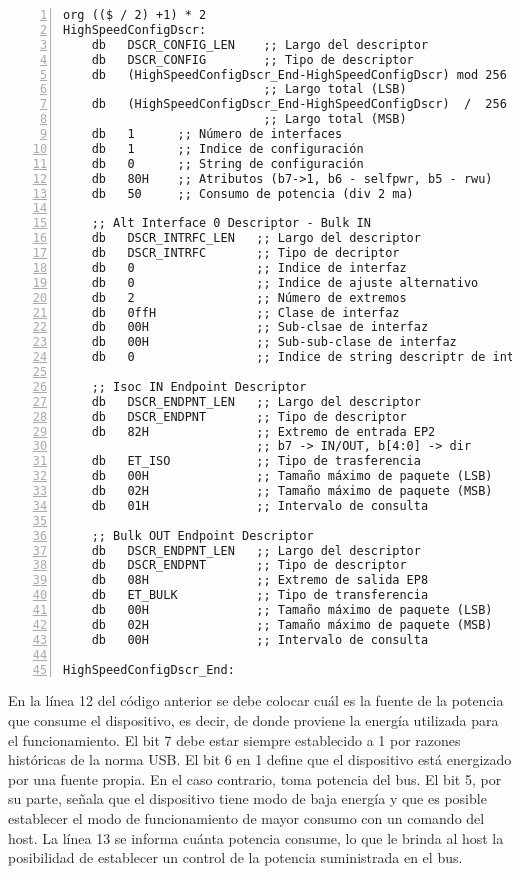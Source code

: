 	\begin{lstlisting}[language={[x86masm]Assembler},backgroundcolor=\color{gray!30},numbers=left]
org (($ / 2) +1) * 2
HighSpeedConfigDscr:
	db   DSCR_CONFIG_LEN	;; Largo del descriptor
	db   DSCR_CONFIG        ;; Tipo de descriptor
	db   (HighSpeedConfigDscr_End-HighSpeedConfigDscr) mod 256
							;; Largo total (LSB)
	db   (HighSpeedConfigDscr_End-HighSpeedConfigDscr)  /  256 
							;; Largo total (MSB)
	db   1      ;; Número de interfaces
	db   1      ;; Indice de configuración
	db   0		;; String de configuración
	db   80H	;; Atributos (b7->1, b6 - selfpwr, b5 - rwu)
	db   50		;; Consumo de potencia (div 2 ma)
	
	;; Alt Interface 0 Descriptor - Bulk IN
	db   DSCR_INTRFC_LEN   ;; Largo del descriptor
	db   DSCR_INTRFC       ;; Tipo de decriptor
	db   0                 ;; Indice de interfaz
	db   0                 ;; Indice de ajuste alternativo
	db   2                 ;; Número de extremos
	db   0ffH              ;; Clase de interfaz
	db   00H               ;; Sub-clsae de interfaz
	db   00H               ;; Sub-sub-clase de interfaz
	db   0                 ;; Indice de string descriptr de interfaz
	
	;; Isoc IN Endpoint Descriptor 
	db   DSCR_ENDPNT_LEN   ;; Largo del descriptor
	db   DSCR_ENDPNT       ;; Tipo de descriptor
	db   82H               ;; Extremo de entrada EP2
						   ;; b7 -> IN/OUT, b[4:0] -> dir
	db   ET_ISO            ;; Tipo de trasferencia
	db   00H               ;; Tamaño máximo de paquete (LSB)
	db   02H               ;; Tamaño máximo de paquete (MSB) 
	db   01H               ;; Intervalo de consulta
	
	;; Bulk OUT Endpoint Descriptor
	db   DSCR_ENDPNT_LEN   ;; Largo del descriptor
	db   DSCR_ENDPNT       ;; Tipo de descriptor
	db   08H               ;; Extremo de salida EP8
	db   ET_BULK           ;; Tipo de transferencia
	db   00H               ;; Tamaño máximo de paquete (LSB)
	db   02H               ;; Tamaño máximo de paquete (MSB)
	db   00H               ;; Intervalo de consulta
	
HighSpeedConfigDscr_End:
	\end{lstlisting}
	
	En la línea 12 del código anterior se debe colocar cuál es la fuente de la potencia que consume el dispositivo, es decir, de donde proviene la energía utilizada para el funcionamiento. El bit 7 debe estar siempre establecido a 1 por razones históricas de la norma USB\cite{USBspec}. El bit 6 en 1 define que el dispositivo está energizado por una fuente propia. En el caso contrario, toma potencia del bus. El bit 5, por su parte, señala que el dispositivo tiene modo de baja energía y que es posible establecer el modo de funcionamiento de mayor consumo con un comando del host. La línea 13 se informa cuánta potencia consume, lo que le brinda al host la posibilidad de establecer un control de la potencia suministrada en el bus.
	
